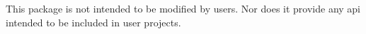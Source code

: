 This package is not intended to be modified by users. Nor does it provide any api intended to be included in user projects. 